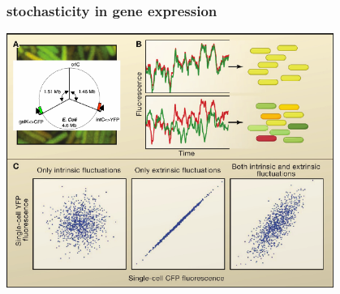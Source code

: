 \begin{frame}
\frametitle{stochasticity in gene expression}
\begin{center}
\includegraphics[width=0.8\textwidth]{fig/rajvOf1.pdf}\\
\hfill \cite{Raj2008a}
\end{center}
\end{frame}
